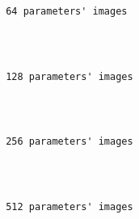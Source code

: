 \documentclass[11pt]{article}
\begin{document}
    \begin{Verbatim}[commandchars=\\\{\}]

 64 parameters' images

    \end{Verbatim}

    \begin{center}
    \end{center}
    { \hspace*{\fill} \\}
    
    \begin{Verbatim}[commandchars=\\\{\}]

 128 parameters' images

    \end{Verbatim}

    \begin{center}
    \end{center}
    { \hspace*{\fill} \\}
    
    \begin{Verbatim}[commandchars=\\\{\}]

 256 parameters' images

    \end{Verbatim}

    \begin{center}
    \end{center}
    { \hspace*{\fill} \\}
    
    \begin{Verbatim}[commandchars=\\\{\}]

 512 parameters' images

    \end{Verbatim}

    \begin{center}
    \end{center}
    { \hspace*{\fill} \\}
    
\end{document}
